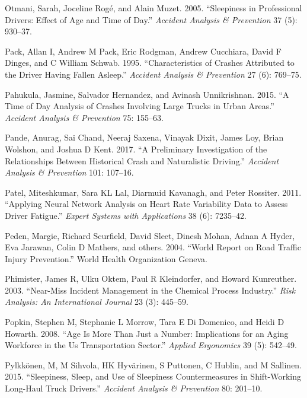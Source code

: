 \documentclass[12pt]{book}
\numberwithin{equation}{chapter}
\begin{document}
\leavevmode\hypertarget{ref-otmani2005sleepiness}{}%
Otmani, Sarah, Joceline Rogé, and Alain Muzet. 2005. ``Sleepiness in Professional Drivers: Effect of Age and Time of Day.'' \emph{Accident Analysis \& Prevention} 37 (5): 930--37.

\leavevmode\hypertarget{ref-pack1995characteristics}{}%
Pack, Allan I, Andrew M Pack, Eric Rodgman, Andrew Cucchiara, David F Dinges, and C William Schwab. 1995. ``Characteristics of Crashes Attributed to the Driver Having Fallen Asleep.'' \emph{Accident Analysis \& Prevention} 27 (6): 769--75.

\leavevmode\hypertarget{ref-pahukula2015time}{}%
Pahukula, Jasmine, Salvador Hernandez, and Avinash Unnikrishnan. 2015. ``A Time of Day Analysis of Crashes Involving Large Trucks in Urban Areas.'' \emph{Accident Analysis \& Prevention} 75: 155--63.

\leavevmode\hypertarget{ref-pande2017preliminary}{}%
Pande, Anurag, Sai Chand, Neeraj Saxena, Vinayak Dixit, James Loy, Brian Wolshon, and Joshua D Kent. 2017. ``A Preliminary Investigation of the Relationships Between Historical Crash and Naturalistic Driving.'' \emph{Accident Analysis \& Prevention} 101: 107--16.

\leavevmode\hypertarget{ref-patel2011applying}{}%
Patel, Miteshkumar, Sara KL Lal, Diarmuid Kavanagh, and Peter Rossiter. 2011. ``Applying Neural Network Analysis on Heart Rate Variability Data to Assess Driver Fatigue.'' \emph{Expert Systems with Applications} 38 (6): 7235--42.

\leavevmode\hypertarget{ref-peden2004world}{}%
Peden, Margie, Richard Scurfield, David Sleet, Dinesh Mohan, Adnan A Hyder, Eva Jarawan, Colin D Mathers, and others. 2004. ``World Report on Road Traffic Injury Prevention.'' World Health Organization Geneva.

\leavevmode\hypertarget{ref-phimister2003near}{}%
Phimister, James R, Ulku Oktem, Paul R Kleindorfer, and Howard Kunreuther. 2003. ``Near-Miss Incident Management in the Chemical Process Industry.'' \emph{Risk Analysis: An International Journal} 23 (3): 445--59.

\leavevmode\hypertarget{ref-popkin2008age}{}%
Popkin, Stephen M, Stephanie L Morrow, Tara E Di Domenico, and Heidi D Howarth. 2008. ``Age Is More Than Just a Number: Implications for an Aging Workforce in the Us Transportation Sector.'' \emph{Applied Ergonomics} 39 (5): 542--49.

\leavevmode\hypertarget{ref-pylkkonen2015sleepiness}{}%
Pylkkönen, M, M Sihvola, HK Hyvärinen, S Puttonen, C Hublin, and M Sallinen. 2015. ``Sleepiness, Sleep, and Use of Sleepiness Countermeasures in Shift-Working Long-Haul Truck Drivers.'' \emph{Accident Analysis \& Prevention} 80: 201--10.
\end{document}
